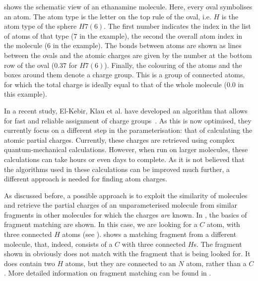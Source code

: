  shows the schematic view of an ethanamine molecule. Here, every oval symbolises an atom. The atom type is the letter on the top rule of the oval, i.e. $H$ is the atom type of the sphere $H7 (6)$. The first number indicates the index in the list of atoms of that type ($7$ in the example), the second the overall atom index in the molecule ($6$ in the example). The bonds between atoms are shown as lines between the ovals and the atomic charges are given by the number at the bottom row of the oval ($0.37$ for $H7 (6)$). Finally, the colouring of the atoms and the boxes around them denote a charge group. This is a group of connected atoms, for which the total charge is ideally equal to that of the whole molecule ($0.0$ in this example).

In a recent study, El-Kebir, Klau et al. have developed an algorithm that allows for fast and reliable assignment of charge groups~\cite{canzar2012charge}. As this is now optimised, they currently focus on a different step in the parameterisation: that of calculating the atomic partial charges. Currently, these charges are retrieved using complex quantum-mechanical calculations. However, when run on larger molecules, these calculations can take hours or even days to complete. As it is not believed that the algorithms used in these calculations can be improved much further, a different approach is needed for finding atom charges.

As discussed before, a possible approach is to exploit the similarity of molecules and retrieve the partial charges of an unparameterised molecule from similar fragments in other molecules for which the charges \emph{are} known. In , the basics of fragment matching are shown. In this case, we are looking for a $C$ atom, with three connected $H$ atoms (see ).  shows a matching fragment from a different molecule, that, indeed, consists of a $C$ with three connected $H$s. The fragment shown in  obviously does not match with the fragment that is being looked for. It does contain two $H$ atoms, but they are connected to an $N$ atom, rather than a $C$. More detailed information on fragment matching can be found in .

